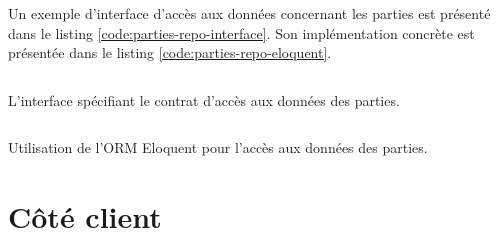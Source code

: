 			Un exemple d'interface d'accès aux données concernant les parties est présenté dans le listing \ref{code:parties-repo-interface}. Son implémentation concrète est présentée dans le listing \ref{code:parties-repo-eloquent}.

			\begin{listing}[H]
				\inputminted[fontsize=\small]{php}{code/PartiesRepository.php}
				\caption{L'interface spécifiant le contrat d'accès aux données des parties.}
				\label{code:parties-repo-interface}
			\end{listing}

			\begin{code}
				\inputminted[fontsize=\small]{php}{code/EloquentPartiesRepository.php}
				\caption{Utilisation de l'ORM Eloquent pour l'accès aux données des parties.}
				\label{code:parties-repo-eloquent}
			\end{code}

\section{Côté client}
